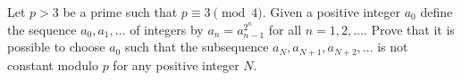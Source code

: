 Let $p > 3$ be a prime such that $p\equiv  3 \pmod 4.$ Given a positive integer $a_0$ define the sequence $a_0, a_1, \ldots $ of integers by $a_n = a^{2^n}_{n-1}$ for all $n = 1, 2,\ldots.$ Prove that it is possible to choose $a_0$ such that the subsequence $a_N , a_{N+1}, a_{N+2}, \ldots $  is not constant modulo $p$ for any positive integer $N.$